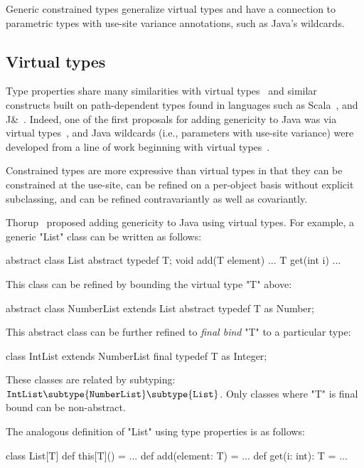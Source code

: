 
Generic constrained types generalize virtual types and 
have a connection to parametric types with use-site variance
annotations, such as Java's wildcards.  

\subsection{Virtual types}

Type properties share many similarities with virtual
types~\cite{mp89-virtual-classes,beta,ernst99-gbeta,ernst06-virtual,cdnw07-tribe}
and similar constructs built on path-dependent types found in
languages such as Scala~\cite{scala}, and J\&~\cite{nqm06}.
Indeed, one of the first proposals for adding genericity to Java
was via virtual types~\cite{thorup97}, and Java
wildcards (i.e., parameters with use-site variance)
were developed from a line of work beginning with virtual
types~\cite{unifying-genericity,variant-parameter-types,adding-wildcards}.

Constrained types are more expressive than virtual
types in that they can be constrained at the use-site,
can be refined on a per-object basis without explicit subclassing,
and can be refined contravariantly
as well as covariantly. 

Thorup~\cite{thorup97}
proposed adding genericity to Java using virtual types.  For example,
a generic \xcd"List" class can be written as follows:
{\footnotesize
\begin{xten}
abstract class List {
  abstract typedef T;
  void add(T element) { ... }
  T get(int i) { ... }
}
\end{xten}}
This class can be refined by bounding the virtual type \xcd"T" above:
{\footnotesize
\begin{xten}
abstract class NumberList extends List {
  abstract typedef T as Number;
}
\end{xten}}
This abstract class can be further refined to \emph{final bind}
\xcd"T" to a particular type:
{\footnotesize
\begin{xten}
class IntList extends NumberList {
  final typedef T as Integer;
}
\end{xten}}
These classes are related by subtyping:
${\tt IntList} \subtype {\tt NumberList} \subtype {\tt List}$.
Only classes where \xcd"T" is final bound can be non-abstract.

The analogous definition of 
\xcd"List" using type properties is as follows:
{\footnotesize
\begin{xten}
class List[T] {
  def this[T]() = { ... }
  def add(element: T) = { ... }
  def get(i: int): T = { ... }
}
\end{xten}}

